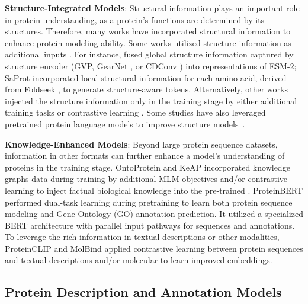 \noindent \textbf{Structure-Integrated Models}: Structural information plays an important role in protein understanding, as a protein's functions are determined by its structures. Therefore, many works have incorporated structural information to enhance protein modeling ability. 
Some works utilized structure information as additional inputs \citep{chen2024endowing,tan2024simple}. For instance, \citet{zhang2023systematic} fused global structure information captured by structure encoder (GVP, GearNet \cite{zhang2022protein}, or CDConv \citep{fan2022continuous}) into representations of ESM-2; SaProt \citep{su2023saprot} incorporated local structural information for each amino acid, derived from Foldseek \citep{van2022foldseek}, to generate structure-aware tokens.
Alternatively, other works injected the structure information only in the training stage by either additional training tasks \citet{wang2022multi,sun2024structure,zhang2024structure} or contrastive learning \citep{wang2025s}.
Some studies have also leveraged pretrained protein language models to improve structure models~\citep{wu2023integration, zheng2024ccpl}.


\noindent \textbf{Knowledge-Enhanced Models}: Beyond large protein sequence datasets, information in other formats can further enhance a model’s understanding of proteins in the training stage. 
OntoProtein \citep{zhang2022ontoprotein} and KeAP \citep{zhou2023protein} incorporated knowledge graphs data during training by additional MLM objectives and/or contrastive learning to inject factual biological knowledge into the pre-trained \proteinllms.
ProteinBERT \citep{brandes2022proteinbert} performed dual-task learning during pretraining to learn both protein sequence modeling and Gene Ontology (GO) annotation prediction. It utilized a specialized BERT architecture with parallel input pathways for sequences and annotations.
To leverage the rich information in textual descriptions or other modalities, ProteinCLIP \citep{wu2024proteinclip} and MolBind \citep{xiao2024molbind} applied contrastive learning between protein sequences and textual descriptions and/or molecular to learn improved embeddings.


\subsection{Protein Description and Annotation Models}


